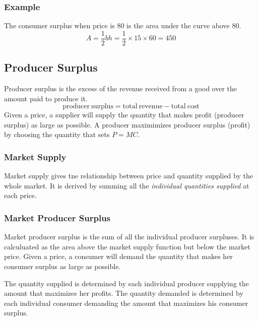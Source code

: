 \documentclass{article}
\begin{document}
\subsubsection{Example}
\begin{center}
\end{center}
The consumer surplus when price is 80 is the area under the curve above 80.
\[ A = \frac{1}{2}bh = \frac{1}{2}\times15\times60 = 450 \]

\subsection{Producer Surplus}
Producer surplus is the excess of the revenue received from a good over the
amount paid to produce it.
\[ \mathrm{producer\ surplus} = \mathrm{total\ revenue}-\mathrm{total\ cost} \]
Given a price, a supplier will supply the quantity that makes profit (producer
surplus) as large as possible. A producer maximimizes producer surplus (profit)
by choosing the quantity that sets \( P = MC \).

\subsubsection{Market Supply}
Market supply gives tne relationship between price and quantity supplied by the
whole market. It is derived by summing all the \textit{individual quantities
supplied} at each price.

\subsubsection{Market Producer Surplus}
Market producer surplus is the sum of all the individual producer surpluses. It
is calculuated as the area above the market supply function but below the market
price. Given a price, a consumer will demand the quantity that makes her
consumer surplus as large as possible. \par
The quantity supplied is determined by each individual producer supplying the
amount that maximizes her profits. The quantity demanded is determined by each
individual consumer demanding the amount that maximizes his consumer surplus.
\end{document}
